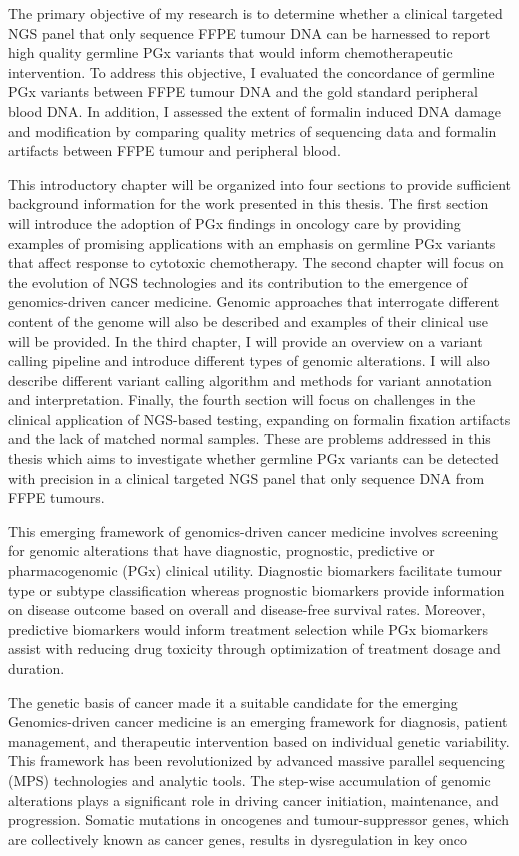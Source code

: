 The primary objective of my research is to determine whether a clinical targeted NGS panel that only sequence FFPE tumour DNA can be harnessed to report high quality germline PGx variants that would inform chemotherapeutic intervention. To address this objective, I evaluated the concordance of germline PGx variants between FFPE tumour DNA and the gold standard peripheral blood DNA. In addition, I assessed the extent of formalin induced DNA damage and modification by comparing quality metrics of sequencing data and formalin artifacts between FFPE tumour and peripheral blood.

This introductory chapter will be organized into four sections to provide sufficient background information for the work presented in this thesis. The first section will introduce the adoption of PGx findings in oncology care by providing examples of promising applications with an emphasis on germline PGx variants that affect response to cytotoxic chemotherapy. The second chapter will focus on the evolution of NGS technologies and its contribution to the emergence of genomics-driven cancer medicine. Genomic approaches that interrogate different content of the genome will also be described and examples of their clinical use will be provided. In the third chapter, I will provide an overview on a variant calling pipeline and introduce different types of genomic alterations. I will also describe different variant calling algorithm and methods for variant annotation and interpretation. Finally, the fourth section will focus on challenges in the clinical application of NGS-based testing, expanding on formalin fixation artifacts and the lack of matched normal samples. These are problems addressed in this thesis which aims to investigate whether germline PGx variants can be detected with precision in a clinical targeted NGS panel that only sequence DNA from FFPE tumours.

This emerging framework of genomics-driven cancer medicine involves screening for genomic alterations that have diagnostic, prognostic, predictive or pharmacogenomic (PGx) clinical utility. Diagnostic biomarkers facilitate tumour type or subtype classification whereas prognostic biomarkers provide information on disease outcome based on overall and disease-free survival rates. Moreover, predictive biomarkers would inform treatment selection while PGx biomarkers assist with reducing drug toxicity through optimization of treatment dosage and duration.

The genetic basis of cancer made it a suitable candidate for the emerging Genomics-driven cancer medicine is an emerging framework for diagnosis, patient management, and therapeutic intervention based on individual genetic variability. This framework has been revolutionized by advanced massive parallel sequencing (MPS) technologies and analytic tools. The step-wise accumulation of genomic alterations plays a significant role in driving cancer initiation, maintenance, and progression. Somatic mutations in oncogenes and tumour-suppressor genes, which are collectively known as cancer genes, results in dysregulation in key onco

